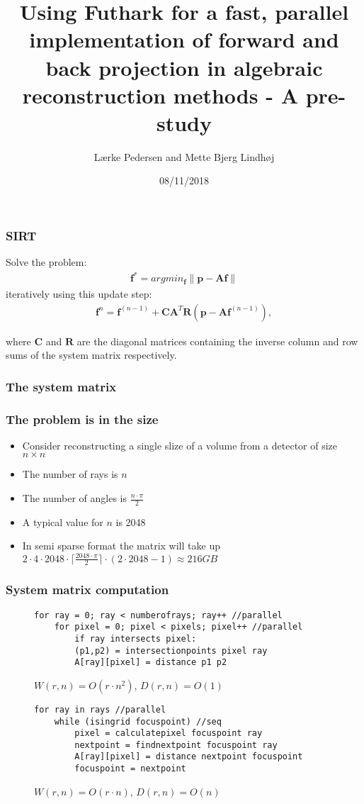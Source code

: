 \documentclass{beamer}
\title[Pre-study]{Using Futhark for a fast, parallel implementation of forward and back projection in algebraic reconstruction methods - A pre-study} %
\author{L\ae rke Pedersen and Mette Bjerg Lindh\o j} %
\institute[DIKU] %
{
University of Copenhagen\\ %
}
\date{08/11/2018} %
\newcommand{\norm}[1]{\left\lVert#1\right\rVert}
\renewcommand{\vec}[1]{\ensuremath{\boldsymbol{#1}}}
\newcommand{\mat}[1]{\ensuremath{\boldsymbol{#1}}}
\newcommand{\inputTikZ}[2]{%
     \scalebox{#1}{}
}
\begin{document}
\begin{frame}
\titlepage %
\end{frame}

\begin{frame}
\frametitle{SIRT}
Solve the problem:
\begin{align}
\vec{f}^{\ast}=argmin_{\vec{f}}\norm{\vec{p}-\mat{A}\vec{f}}
\end{align}
iteratively using this update step:
\begin{align}
\vec{f}^{n} = \vec{f}^{(n-1)}+\mat{C}\mat{A}^{T}\mat{R}(\vec{p}-\mat{A}\vec{f}^{(n-1)}),
\end{align}

where $\mat{C}$ and $\mat{R}$ are the diagonal matrices containing the inverse column and row sums of the system matrix respectively.
\end{frame}

\begin{frame}
\frametitle{The system matrix}
\inputTikZ{0.6}{figures/weightings.tex}
\end{frame}

\begin{frame}
\frametitle{The problem is in the size}
\begin{itemize}
\item{Consider reconstructing a single slize of a volume from a detector of size $n\times n$}
\item{The number of rays is $n$}
\item{The number of angles is $\frac{n\cdot\pi}{2}$}
\item{A typical value for $n$ is 2048 }
\item{In semi sparse format the matrix will take up $2\cdot4\cdot2048\cdot\lceil\frac{2048\cdot\pi}{2}\rceil\cdot (2\cdot2048-1)\approx 216GB$}
\end{itemize}
\end{frame}

\begin{frame}[fragile]
\frametitle{System matrix computation}
\begin{figure}[!h]
\begin{lstlisting}[frame=single]
for ray = 0; ray < numberofrays; ray++ //parallel
	for pixel = 0; pixel < pixels; pixel++ //parallel
		if ray intersects pixel:
        (p1,p2) = intersectionpoints pixel ray
        A[ray][pixel] = distance p1 p2
\end{lstlisting}
  \caption{$W(r,n)=O(r\cdot n^2)$, $D(r,n)=O(1)$}
\end{figure}
\begin{figure}[!h]
\begin{lstlisting}[frame=single]
for ray in rays //parallel
	while (isingrid focuspoint) //seq
        pixel = calculatepixel focuspoint ray
        nextpoint = findnextpoint focuspoint ray
        A[ray][pixel] = distance nextpoint focuspoint
        focuspoint = nextpoint
\end{lstlisting}
  \caption{$W(r,n)=O(r\cdot n)$, $D(r,n)=O(n)$}
\end{figure}
\end{frame}
\end{document}
